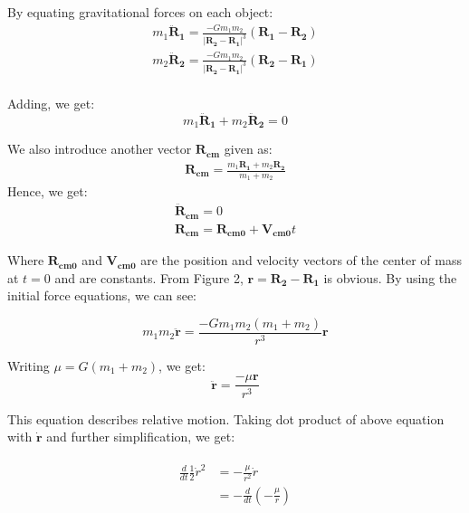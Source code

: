 \documentclass[12pt, letterpaper]{article}
\begin{document}
By equating gravitational forces on each object:
\begin{gather*}
m_1\mathbf{\ddot{R}_{1}} = \frac{-Gm_1m_2}{|\mathbf{R_2} - \mathbf{R_1}|^3}(\mathbf{R_1} - \mathbf{R_2})\\
m_2\mathbf{\ddot{R}_{2}} = \frac{-Gm_1m_2}{|\mathbf{R_2} - \mathbf{R_1}|^3}(\mathbf{R_2} - \mathbf{R_1})\\
\end{gather*}

Adding, we get:
\begin{displaymath}
m_1\mathbf{\ddot{R}_{1}}  + m_2\mathbf{\ddot{R}_{2}} = 0
\end{displaymath}

We also introduce another vector $\mathbf{R_{cm}}$ given as:
\begin{gather*}
\mathbf{R_{cm}} = \frac{m_1\mathbf{R_1}+m_2\mathbf{R_2}}{m_1 + m_2}
\end{gather*}
Hence, we get:
\begin{gather*}
\mathbf{\ddot{R}_{cm}} = 0 \\
\mathbf{R_{cm}} = \mathbf{R_{cm0}} + \mathbf{V_{cm0}}t
\end{gather*}

Where $\mathbf{R_{cm0}}$ and $\mathbf{V_{cm0}}$ are the position and velocity vectors of the center of mass at $t=0$ and are constants. From Figure 2, $\mathbf{r} = \mathbf{R_2} - \mathbf{R_1}$ is obvious. By using the initial force equations, we can see:

\begin{displaymath}
m_1m_2 \mathbf{\ddot{r}} = \frac{-Gm_1m_2(m_1+m_2)}{r^3}\mathbf{r}
\end{displaymath}

Writing $\mu = G(m_1+m_2)$, we get:
\begin{displaymath}
\mathbf{\ddot{r}}  = \frac{-\mu\mathbf{r}}{r^3}
\end{displaymath}

This equation describes relative motion. Taking dot product of above equation with $\mathbf{\dot{r}}$ and further simplification, we get:

\begin{gather*}
\begin{split}
\frac{d}{dt}\frac{1}{2}\dot{r}^2 & = - \frac{\mu}{r^2}\dot{r}\\
								& = - \frac{d}{dt}\left(-\frac{\mu}{r}\right)
\end{split}
\end{gather*}
\end{document}
